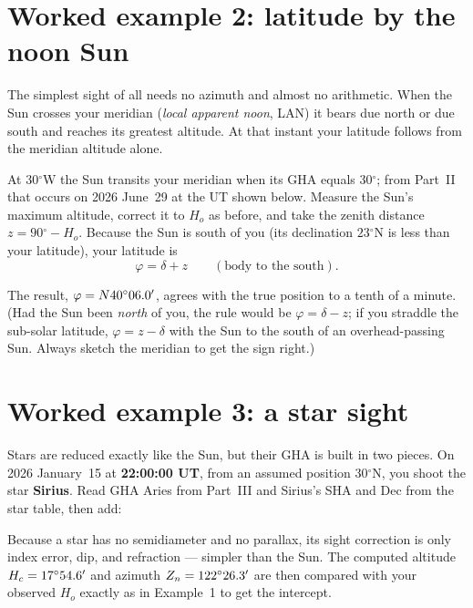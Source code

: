 \documentclass[10pt,letterpaper,twoside]{book}
\newcommand{\dg}{\ensuremath{{}^{\circ}}}
\begin{document}
\chapter{Worked example 2: latitude by the noon Sun}

The simplest sight of all needs no azimuth and almost no arithmetic. When the Sun
crosses your meridian (\emph{local apparent noon}, LAN) it bears due north or due
south and reaches its greatest altitude. At that instant your latitude follows
from the meridian altitude alone.

At $30\dg$W the Sun transits your meridian when its GHA equals $30\dg$; from
Part~II that occurs on 2026 June~29 at the UT shown below. Measure the Sun's
maximum altitude, correct it to $H_o$ as before, and take the zenith distance
$z=90\dg-H_o$. Because the Sun is south of you (its declination $23\dg$N is less
than your latitude), your latitude is
\[
  \varphi = \delta + z \qquad (\text{body to the south}).
\]

\begin{center}\end{center}

\noindent The result, $\varphi=\exTwoLat$, agrees with the true position to a
tenth of a minute. (Had the Sun been \emph{north} of you, the rule would be
$\varphi=\delta-z$; if you straddle the sub-solar latitude,
$\varphi=z-\delta$ with the Sun to the south of an overhead-passing Sun. Always
sketch the meridian to get the sign right.)

\chapter{Worked example 3: a star sight}

Stars are reduced exactly like the Sun, but their GHA is built in two pieces. On
2026 January~15 at \textbf{22:00:00 UT}, from an assumed position $30\dg$N, you
shoot the star \textbf{Sirius}. Read GHA Aries from Part~III and Sirius's SHA and
Dec from the star table, then add:

\begin{center}\end{center}

\noindent Because a star has no semidiameter and no parallax, its sight correction
is only index error, dip, and refraction --- simpler than the Sun. The computed
altitude $H_c=\exThreeHc$ and azimuth $Z_n=\exThreeZn$ are then compared with your
observed $H_o$ exactly as in Example~1 to get the intercept.
\end{document}
